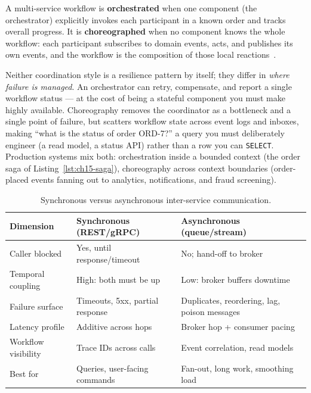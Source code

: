 \begin{definition}
\label{def:ch15-orch-choreo}
A multi-service workflow is \textbf{orchestrated} when one component (the
orchestrator) explicitly invokes each participant in a known order and
tracks overall progress. It is \textbf{choreographed} when no component
knows the whole workflow: each participant subscribes to domain events,
acts, and publishes its own events, and the workflow is the composition of
those local reactions~\cite{newman2021microservices}.
\end{definition}

Neither coordination style is a resilience pattern by itself; they differ in
\emph{where failure is managed}. An orchestrator can retry, compensate, and
report a single workflow status --- at the cost of being a stateful
component you must make highly available. Choreography removes the
coordinator as a bottleneck and a single point of failure, but scatters
workflow state across event logs and inboxes, making ``what is the status
of order ORD-7?'' a query you must deliberately engineer (a read model, a
status API) rather than a row you can \texttt{SELECT}. Production systems
mix both: orchestration inside a bounded context (the order saga of
Listing~\ref{lst:ch15-saga}), choreography across context boundaries
(order-placed events fanning out to analytics, notifications, and fraud
screening).

\begin{table}[h]
  \centering
  \small
  \begin{tabularx}{\textwidth}{l X X}
    \toprule
    \textbf{Dimension} & \textbf{Synchronous (REST/gRPC)} & \textbf{Asynchronous (queue/stream)} \\
    \midrule
    Caller blocked & Yes, until response/timeout & No; hand-off to broker \\
    Temporal coupling & High: both must be up & Low: broker buffers downtime \\
    Failure surface & Timeouts, 5xx, partial response & Duplicates, reordering, lag, poison messages \\
    Latency profile & Additive across hops & Broker hop + consumer pacing \\
    Workflow visibility & Trace IDs across calls & Event correlation, read models \\
    Best for & Queries, user-facing commands & Fan-out, long work, smoothing load \\
    \bottomrule
  \end{tabularx}
  \caption{Synchronous versus asynchronous inter-service communication.}
  \label{tab:ch15-sync-async}
\end{table}


